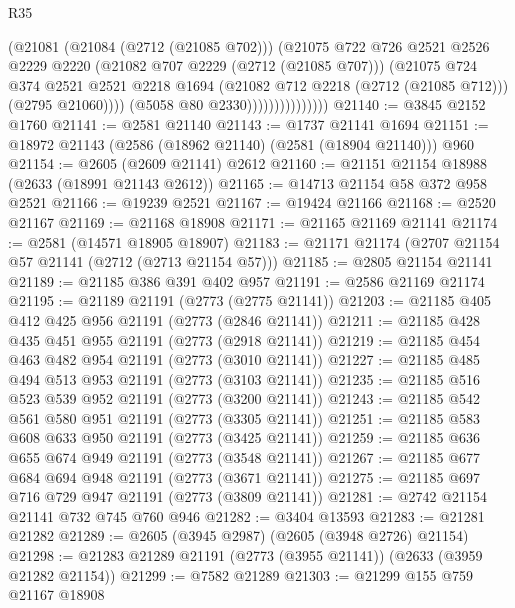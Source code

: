 \begin{lexlean}{R35}
\begin{coremodule}
                                (@21081
                                  (@21084 (@2712 (@21085 @702)))
                                  (@21075
                                    @722
                                    @726
                                    @2521
                                    @2526
                                    @2229
                                    @2220
                                    (@21082 @707 @2229 (@2712 (@21085 @707)))
                                    (@21075
                                      @724
                                      @374
                                      @2521
                                      @2521
                                      @2218
                                      @1694
                                      (@21082 @712 @2218 (@2712 (@21085 @712)))
                                      (@2795 @21060))))
                                (@5058 @80 @2330)))))))))))))))
@21140 := @3845 @2152 @1760
@21141 := @2581 @21140
@21143 := @1737 @21141 @1694
@21151 := @18972 @21143 (@2586 (@18962 @21140) (@2581 (@18904 @21140))) @960
@21154 := @2605 (@2609 @21141) @2612
@21160 := @21151 @21154 @18988 (@2633 (@18991 @21143 @2612))
@21165 := @14713 @21154 @58 @372 @958 @2521
@21166 := @19239 @2521
@21167 := @19424 @21166
@21168 := @2520 @21167
@21169 := @21168 @18908
@21171 := @21165 @21169 @21141
@21174 := @2581 (@14571 @18905 @18907)
@21183 := @21171 @21174 (@2707 @21154 @57 @21141 (@2712 (@2713 @21154 @57)))
@21185 := @2805 @21154 @21141
@21189 := @21185 @386 @391 @402 @957
@21191 := @2586 @21169 @21174
@21195 := @21189 @21191 (@2773 (@2775 @21141))
@21203 := @21185 @405 @412 @425 @956 @21191 (@2773 (@2846 @21141))
@21211 := @21185 @428 @435 @451 @955 @21191 (@2773 (@2918 @21141))
@21219 := @21185 @454 @463 @482 @954 @21191 (@2773 (@3010 @21141))
@21227 := @21185 @485 @494 @513 @953 @21191 (@2773 (@3103 @21141))
@21235 := @21185 @516 @523 @539 @952 @21191 (@2773 (@3200 @21141))
@21243 := @21185 @542 @561 @580 @951 @21191 (@2773 (@3305 @21141))
@21251 := @21185 @583 @608 @633 @950 @21191 (@2773 (@3425 @21141))
@21259 := @21185 @636 @655 @674 @949 @21191 (@2773 (@3548 @21141))
@21267 := @21185 @677 @684 @694 @948 @21191 (@2773 (@3671 @21141))
@21275 := @21185 @697 @716 @729 @947 @21191 (@2773 (@3809 @21141))
@21281 := @2742 @21154 @21141 @732 @745 @760 @946
@21282 := @3404 @13593
@21283 := @21281 @21282
@21289 := @2605 (@3945 @2987) (@2605 (@3948 @2726) @21154)
@21298 := @21283 @21289 @21191 (@2773 (@3955 @21141)) (@2633 (@3959 @21282 @21154))
@21299 := @7582 @21289
@21303 := @21299 @155 @759 @21167 @18908

\end{coremodule}
\end{lexlean}
